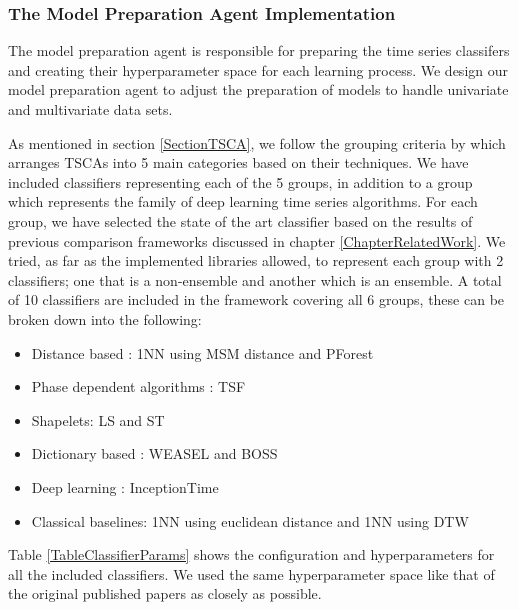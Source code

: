 \subsubsection*{The Model Preparation Agent Implementation}
\label{ModelPreparationAgentImplementation}
The model preparation agent is responsible for preparing the time series classifers and creating their hyperparameter space for each learning process.
We design our model preparation agent to adjust the preparation of models to handle univariate and multivariate data sets.

As mentioned in section \ref{SectionTSCA}, we follow the grouping criteria by \cite{bagnall2017great} which arranges TSCAs into 5 main categories based on their techniques.
We have included classifiers representing each of the 5 groups, in addition to a  group which represents the family of deep learning time series algorithms.
For each group, we have selected the state of the art classifier based on the results of previous comparison frameworks discussed in chapter \ref{ChapterRelatedWork}.
We tried, as far as the implemented libraries allowed, to represent each group with 2 classifiers; one that is a non-ensemble and another which is an ensemble.
A total of 10 classifiers are included in the framework covering all 6 groups, these can be broken down into the following:
\begin{itemize}
  \item Distance based : 1NN using MSM distance and PForest
  \item Phase dependent algorithms : TSF
  \item Shapelets: LS and ST
  \item Dictionary based : WEASEL and BOSS
  \item Deep learning : InceptionTime
  \item Classical baselines: 1NN using euclidean distance and 1NN using DTW
\end{itemize}

Table \ref{TableClassifierParams} shows the configuration and hyperparameters for all the included classifiers.
We used the same hyperparameter space like that of the original published papers as closely as possible.

